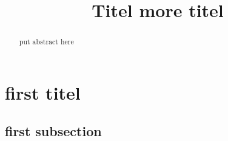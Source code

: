 \documentclass[12pt]{scrartcl}
\title{ %
Titel
\vspace{0.2cm}
\Large more titel }
\begin{document}
 \maketitle
 \thispagestyle{firststyle}
 \pagestyle{firststyle}
 \begin{abstract}
 \begin{center}
  put abstract here  
 \end{center}
 \vspace{0.5cm}
\hrulefill
\end{abstract}

 \pagestyle{documentstyle}
 \tableofcontents
 \pagebreak
\section{first titel}
\subsection{first subsection}
 
 
\end{document}
